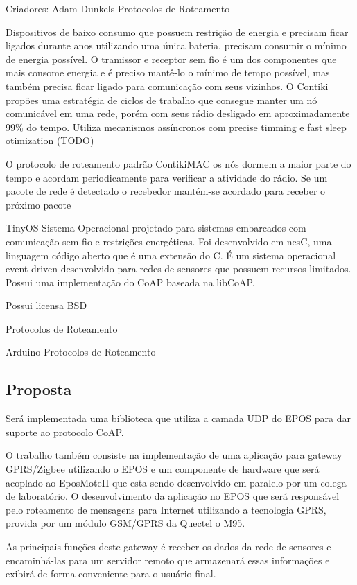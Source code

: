 Criadores: Adam Dunkels
Protocolos de Roteamento

Dispositivos de baixo consumo que possuem restrição de energia e precisam ficar ligados durante anos utilizando uma única bateria, precisam consumir o mínimo de energia possível. O tramissor e receptor sem fio é um dos componentes que mais consome energia e é preciso mantê-lo o mínimo de tempo possível, mas também precisa ficar ligado para comunicação com seus vizinhos. O Contiki propões uma estratégia de ciclos de trabalho que consegue manter um nó comunicável em uma rede, porém com seus rádio desligado em aproximadamente 99\% do tempo. Utiliza mecanismos assíncronos com precise timming e fast sleep otimization (TODO)

O protocolo de roteamento padrão ContikiMAC os nós dormem a maior parte do tempo e acordam periodicamente para verificar a atividade do rádio. Se um pacote de rede é detectado o recebedor mantém-se acordado para receber o próximo pacote 

TinyOS Sistema Operacional projetado para sistemas embarcados com comunicação sem fio e restrições energéticas. Foi desenvolvido em nesC, uma linguagem código aberto que é uma extensão do C. É um sistema operacional event-driven desenvolvido para redes de sensores que possuem recursos limitados. Possui uma implementação do CoAP baseada na libCoAP.

Possui licensa BSD

Protocolos de Roteamento
  
Arduino Protocolos de Roteamento


\subsection{Proposta}
Será implementada uma biblioteca que utiliza a camada UDP do EPOS para dar suporte ao protocolo CoAP.

O trabalho também consiste na implementação de uma aplicação para gateway GPRS/Zigbee utilizando o EPOS e um componente de hardware que será acoplado ao EposMoteII que esta sendo desenvolvido em paralelo por um colega de laboratório. O desenvolvimento da aplicação no EPOS que será responsável pelo roteamento de mensagens para Internet utilizando a tecnologia GPRS, provida por um módulo GSM/GPRS da Quectel o M95.

As principais funções deste gateway é receber os dados da rede de sensores e encaminhá-las para um servidor remoto que armazenará essas informações e exibirá de forma conveniente para o usuário final.

